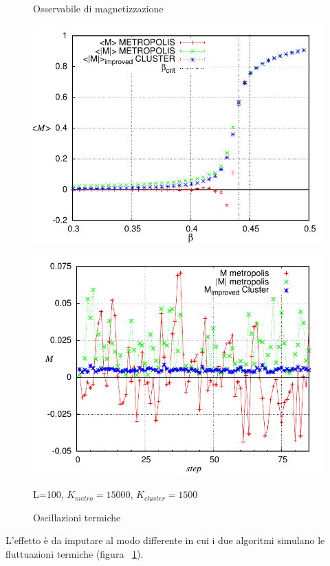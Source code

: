 \begin{figure}[htbp]
     \begin{minipage}{0.5\textwidth}
\centering
\caption[Preliminari$\_$Magnetizzazione.cpp ]{\footnotesize Osservabile di magnetizzazione}\label{fig: Confronto_M_andamento}
\includegraphics[scale=0.65]{Immagini/Confronto_M_andamento}
     \end{minipage}
     \begin{minipage}{0.5\textwidth}
\centering
\caption[ParteB$\_$Termal$\_$M$\_$Confronto.cpp]{\footnotesize Oscillazioni termiche }\label{fig: Confronto_M_termal}
\includegraphics[scale=0.65]{Immagini/Confronto_M_termal}
     \end{minipage}
  \newline \center \footnotesize L=100, $K_{metro} = 15000$, $K_{cluster} = 1500$
\end{figure}
L'effetto è da imputare al modo differente in cui i due algoritmi simulano le fluttuazioni termiche (figura ~\ref{fig: Confronto_M_termal}).






